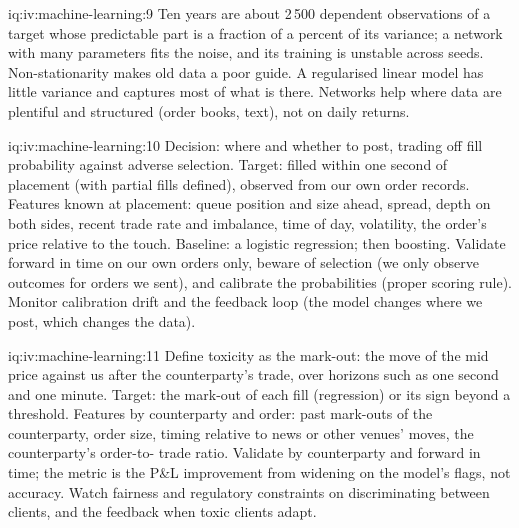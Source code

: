 \begin{solution}{iq:iv:machine-learning:9}
Ten years are about 2\,500 dependent observations of a target whose predictable part is a fraction of a percent of its
variance; a network with many parameters fits the noise, and its training is unstable across seeds. Non-stationarity makes old
data a poor guide. A regularised linear model has little variance and captures most of what is there. Networks help where data
are plentiful and structured (order books, text), not on daily returns.
\end{solution}

\begin{solution}{iq:iv:machine-learning:10}
Decision: where and whether to post, trading off fill probability against adverse selection. Target: filled within one second
of placement (with partial fills defined), observed from our own order records. Features known at placement: queue position
and size ahead, spread, depth on both sides, recent trade rate and imbalance, time of day, volatility, the order's price
relative to the touch. Baseline: a logistic regression; then boosting. Validate forward in time on our own orders only, beware
of selection (we only observe outcomes for orders we sent), and calibrate the probabilities (proper scoring rule). Monitor
calibration drift and the feedback loop (the model changes where we post, which changes the data).
\end{solution}

\begin{solution}{iq:iv:machine-learning:11}
Define toxicity as the mark-out: the move of the mid price against us after the counterparty's trade, over horizons such as one
second and one minute. Target: the mark-out of each fill (regression) or its sign beyond a threshold. Features by counterparty and
order: past mark-outs of the counterparty, order size, timing relative to news or other venues' moves, the counterparty's order-to-
trade ratio. Validate by counterparty and forward in time; the metric is the P\&L improvement from widening on the model's flags,
not accuracy. Watch fairness and regulatory constraints on discriminating between clients, and the feedback when toxic clients
adapt.
\end{solution}

